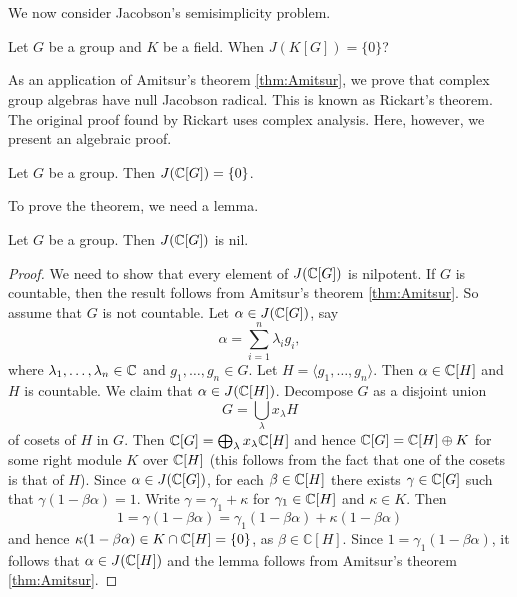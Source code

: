 \chapter{}


We now consider Jacobson's semisimplicity problem. 

\begin{openproblem}
\label{Jacobson's semisimplicity problem}
Let $G$ be a group and $K$ be a field. When $J(K[G])=\{0\}$?
\end{openproblem}

As an application of Amitsur's theorem \ref{thm:Amitsur}, 
we prove that 
complex group algebras have null Jacobson radical.
This is known as 
Rickart's theorem. The original proof found by Rickart 
uses complex analysis. Here, however, 
we present an algebraic proof. 

\begin{theorem}[Rickart]
\label{thm:Rickart}
    Let $G$ be a group. Then $J(\mathbb{C}[G])=\{0\}$.
\end{theorem}

To prove the theorem, we need a lemma.

\begin{lemma}
Let $G$ be a group. Then $J(\mathbb{C}[G])$ is nil.        
\end{lemma}

\begin{proof}
    We need to show that every element of $J(\mathbb{C}[G])$ is nilpotent. 
    If $G$ is countable, then the result follows from Amitsur's theorem \ref{thm:Amitsur}. So assume that 
    $G$ is not countable. Let $\alpha\in J(\mathbb{C}[G])$, say
    \[
    \alpha=\sum_{i=1}^n\lambda_ig_i,
    \]
    where $\lambda_1,\dots,\lambda_n\in\mathbb{C}$ and $g_1,\dots,g_n\in G$. Let $H=\langle g_1,\dots,g_n\rangle$.
    Then $\alpha\in \mathbb{C}[H]$ and $H$ is countable. We claim that $\alpha\in J(\mathbb{C}[H])$. Decompose
    $G$ as a disjoint union 
    \[
    G=\bigcup_\lambda x_\lambda H
    \]
    of cosets of $H$ in $G$. Then $\mathbb{C}[G]=\bigoplus_\lambda x_\lambda\mathbb{C}[H]$ and
    hence $\mathbb{C}[G]=\mathbb{C}[H]\oplus K$ for some right module $K$ over $\mathbb{C}[H]$ (this follows
    from the fact that one of the cosets is that of $H$). Since $\alpha\in J(\mathbb{C}[G])$, for each 
    $\beta\in\mathbb{C}[H]$ there exists $\gamma\in\mathbb{C}[G]$ such that 
    $\gamma(1-\beta\alpha)=1$. Write $\gamma=\gamma_1+\kappa$ for $\gamma_1\in\mathbb{C}[H]$ and $\kappa\in K$. Then
    \[
    1=\gamma(1-\beta\alpha)=\gamma_1(1-\beta\alpha)+\kappa(1-\beta\alpha)
    \]
    and hence $\kappa(1-\beta\alpha)\in K\cap \mathbb{C}[H]=\{0\}$, as $\beta\in\mathbb{C}[H]$. 
    Since $1=\gamma_1(1-\beta\alpha)$, it follows that
    $\alpha\in J(\mathbb{C}[H])$ and the lemma follows from Amitsur's theorem \ref{thm:Amitsur}.  
\end{proof}

